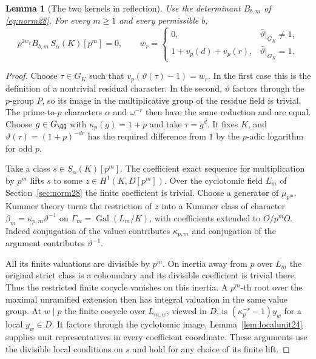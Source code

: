 \documentclass[a4paper,11pt]{article}
\newtheorem{lemma}[proposition]{Lemma}
\theoremstyle{definition}
\theoremstyle{remark}
\numberwithin{equation}{section}
\begin{document}
\begin{lemma}[The two kernels in reflection]\leavevmode\label{lem:loss143}
Use the determinant \(B_{b,m}\) of \eqref{eq:norm28}. For
every \(m\ge1\) and every permissible \(b\),
\[
       p^{2w_r}B_{b,m}\,S_\alpha(K)[p^m]=0,\qquad
       w_r=
       \begin{cases}
       0,&\bar\vartheta|_{G_K}\ne 1,\\
       1+v_p(d)+v_p(r),&\bar\vartheta|_{G_K}=1 .
       \end{cases}
\]
\end{lemma}
\begin{proof}
Choose \(\tau\in G_K\) such that
\(v_p(\vartheta(\tau)-1)=w_r\). In the first case this is the
definition of a nontrivial residual character. In the second,
\(\bar\vartheta\) factors through the \(p\)-group \(P\), so its
image in the multiplicative group of the residue field is
trivial. The prime-to-\(p\) characters \(\alpha\) and
\(\omega^{-r}\) then have the same reduction and are equal.
Choose \(g\in G_\QQ\) with \(\kappa_p(g)=1+p\) and take
\(\tau=g^d\). It fixes \(K\), and
\(\vartheta(\tau)=(1+p)^{-dr}\) has the required difference
from \(1\) by the \(p\)-adic logarithm for odd \(p\).

Take a class \(s\in S_\alpha(K)[p^m]\). The coefficient exact
sequence for multiplication by \(p^m\) lifts \(s\) to some
\(z\in H^1(K,D[p^m])\). Over the cyclotomic field \(L_m\)
of Section~\ref{sec:norm28} the finite coefficient is trivial.
Choose a generator of \(\mu_{p^m}\). Kummer theory turns
the restriction of \(z\) into a Kummer class of character
\(\beta_m=\kappa_{p,m}\vartheta^{-1}\) on
\(\Gamma_m=\operatorname{Gal}(L_m/K)\), with coefficients
extended to \(O/p^mO\). Indeed conjugation of the values
contributes \(\kappa_{p,m}\) and conjugation of the argument
contributes \(\vartheta^{-1}\).

All its finite valuations are divisible by \(p^m\).
On inertia away from \(p\) over \(L_m\) the original strict
class is a coboundary and its divisible coefficient is trivial
there. Thus the restricted finite cocycle vanishes on this
inertia. A \(p^m\)-th root over the maximal unramified extension
then has integral valuation in the same value group.
At \(w\mid p\) the finite cocycle over \(L_{m,w}\), viewed in
\(D\), is \((\kappa_p^{-r}-1)y_w\) for a local \(y_w\in D\).
It factors through the cyclotomic image. Lemma~\ref{lem:localunit24}
supplies unit representatives in every coefficient coordinate.
These arguments use the divisible local conditions on \(s\)
and hold for any choice of its finite lift.


\end{proof}
\end{document}
